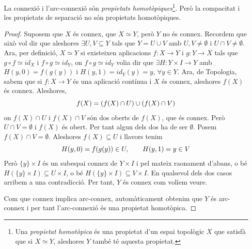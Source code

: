 \documentclass[../main.tex]{subfiles}
\begin{document}
\begin{prop}[Exercici 5]\label{exercici1.5}
\label{prop:propietatshomotopiques} La connexió i l'arc-connexió són \textit{propietats homotòpiques}\footnote{Una \textit{propietat homotòpica} és una propietat d'un espai topològic $X$ que satisfà que si $X\simeq Y$, aleshores $Y$ també té aquesta propietat.}. Però la compacitat i les propietats de separació no són propietats homotòpiques.
\end{prop}
\begin{proof}
Suposem que $X$ és connex, que $X\simeq Y$, però $Y$ no és connex. Recordem que això vol dir que aleshores $\exists U,V\subseteq Y$ tals que $Y = U\cup V$ amb $U,V\not=\emptyset$ i $U\cap V\not=\emptyset$. Ara, per definició, $X\simeq Y$ si existeixen aplicacions $f:X\rightarrow Y$ i $g:Y\rightarrow X$ tals que $g\circ f \simeq id_X$ i $f\circ g\simeq id_Y$, on $f\circ g\simeq id_Y$ volia dir que $\exists H:Y\times I\rightarrow Y$ amb $H(y,0) = f(g(y))$ i $H(y,1) = id_Y(y) = y$, $\forall y\in Y$. Ara, de Topologia, sabem que si $f:X\rightarrow Y$ és una aplicació contínua i $X$ és connex, aleshores $f(X)$ és connex. Aleshores, 
\begin{equation}
    \notag
    f(X) = (f(X)\cap U)\cup (f(X) \cap V)
\end{equation}
on $f(X)\cap U$ i $f(X)\cap V$ són dos oberts de $f(X)$, que és connex. Però $U\cap V = \emptyset$ i $f(X)$ és obert. Per tant algun dels dos ha de ser $\emptyset$. Posem $f(X)\cap V = \emptyset$. Aleshores $f(X)\subseteq U$ i llavors tenim
\begin{equation}
    \notag
    H(y,0) = f(g(y))\in U,\qquad H(y,1) = y\in V
\end{equation}
Però $\{y\}\times I$ és un subespai connex de $Y\times I$ i pel mateix raonament d'abans, o bé $H(\{y\}\times I)\subseteq U\times I$, o bé $H(\{y\}\times I)\subseteq V\times I$. En qualsevol dels dos casos arribem a una contradicció. Per tant, $Y$ és connex com volíem veure.

Com que connex implica arc-connex, automàticament obtenim que $Y$ és arc-connex i per tant l'arc-connexió és una propietat homotòpica.


\end{proof}
\end{document}
